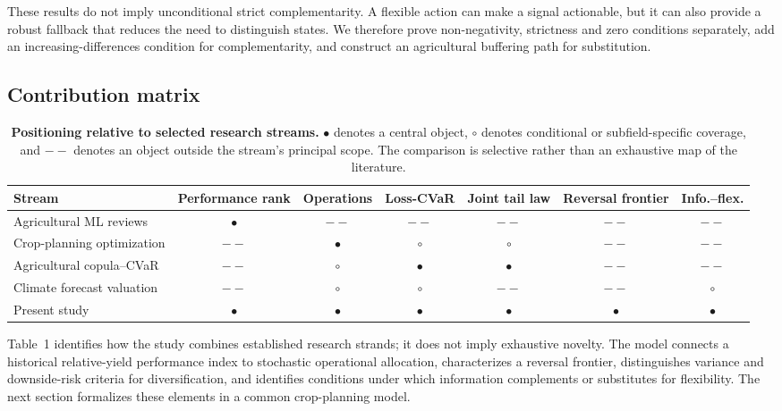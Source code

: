 These results do not imply unconditional strict complementarity. A flexible action
can make a signal actionable, but it can also provide a robust fallback that
reduces the need to distinguish states. We therefore prove non-negativity,
strictness and zero conditions separately, add an increasing-differences
condition for complementarity, and construct an agricultural buffering path
for substitution.

\subsection{Contribution matrix}

\begin{table}[t]
\centering\scriptsize
\caption{\textbf{Positioning relative to selected research streams.}
\(\bullet\) denotes a central object, \(\circ\) denotes conditional or
subfield-specific coverage, and \(--\) denotes an object outside the stream's
principal scope. The comparison is selective rather than an exhaustive map of
the literature.}
\begin{tabularx}{\textwidth}{>{\raggedright\arraybackslash}Xcccccc}
\toprule
Stream & Performance rank & Operations & Loss-CVaR & Joint tail law &
Reversal frontier & Info.--flex.\\
\midrule
Agricultural ML reviews & \(\bullet\) & \(--\) & \(--\) & \(--\) & \(--\) & \(--\)\\
Crop-planning optimization & \(--\) & \(\bullet\) & \(\circ\) & \(\circ\) & \(--\) & \(--\)\\
Agricultural copula--CVaR & \(--\) & \(\circ\) & \(\bullet\) & \(\bullet\) & \(--\) & \(--\)\\
Climate forecast valuation & \(--\) & \(\circ\) & \(\circ\) & \(--\) & \(--\) & \(\circ\)\\
Present study & \(\bullet\) & \(\bullet\) & \(\bullet\) &
\(\bullet\) & \(\bullet\) & \(\bullet\)\\
\bottomrule
\end{tabularx}
\end{table}

Table~1 identifies how the study combines established research strands; it
does not imply exhaustive novelty. The model connects a historical
relative-yield performance index to stochastic operational allocation,
characterizes a reversal frontier, distinguishes variance and downside-risk
criteria for diversification, and identifies conditions under which
information complements or substitutes for flexibility. The next section
formalizes these elements in a common crop-planning model.
